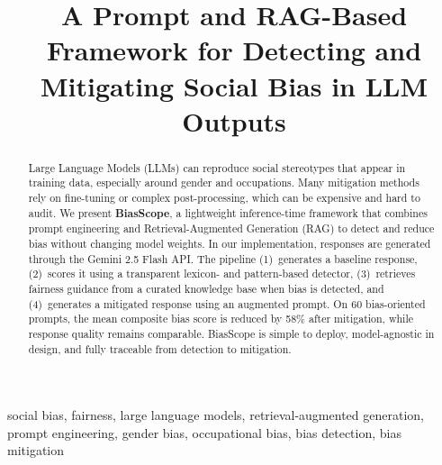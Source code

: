 \documentclass[conference]{IEEEtran}
\begin{document}
\title{A Prompt and RAG-Based Framework for Detecting and Mitigating Social Bias in LLM Outputs}

\author{
  \and
  \and
}

\maketitle

\begin{abstract}
Large Language Models (LLMs) can reproduce social stereotypes that appear in training data, especially around gender and occupations. Many mitigation methods rely on fine-tuning or complex post-processing, which can be expensive and hard to audit. We present \textbf{BiasScope}, a lightweight inference-time framework that combines prompt engineering and Retrieval-Augmented Generation (RAG) to detect and reduce bias without changing model weights. In our implementation, responses are generated through the Gemini 2.5 Flash API. The pipeline (1)~generates a baseline response, (2)~scores it using a transparent lexicon- and pattern-based detector, (3)~retrieves fairness guidance from a curated knowledge base when bias is detected, and (4)~generates a mitigated response using an augmented prompt. On 60 bias-oriented prompts, the mean composite bias score is reduced by 58\% after mitigation, while response quality remains comparable. BiasScope is simple to deploy, model-agnostic in design, and fully traceable from detection to mitigation.
\end{abstract}

\begin{IEEEkeywords}
social bias, fairness, large language models, retrieval-augmented generation, prompt engineering, gender bias, occupational bias, bias detection, bias mitigation
\end{IEEEkeywords}
\end{document}
